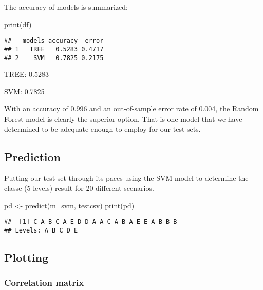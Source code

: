 \documentclass[
]{article}
\newenvironment{Shaded}{\begin{snugshade}}{\end{snugshade}}
\newcommand{\FunctionTok}[1]{\textcolor[rgb]{0.00,0.00,0.00}{#1}}
\newcommand{\NormalTok}[1]{#1}
\newcommand{\OtherTok}[1]{\textcolor[rgb]{0.56,0.35,0.01}{#1}}
\begin{document}
The accuracy of models is summarized:

\begin{Shaded}
\begin{Highlighting}[]
\FunctionTok{print}\NormalTok{(df)}
\end{Highlighting}
\end{Shaded}

\begin{verbatim}
##   models accuracy  error
## 1   TREE   0.5283 0.4717
## 2    SVM   0.7825 0.2175
\end{verbatim}

TREE: 0.5283

SVM: 0.7825

With an accuracy of 0.996 and an out-of-sample error rate of 0.004, the
Random Forest model is clearly the superior option. That is one model
that we have determined to be adequate enough to employ for our test
sets.

\hypertarget{prediction}{%
\subsection{Prediction}\label{prediction}}

Putting our test set through its paces using the SVM model to determine
the classe (5 levels) result for 20 different scenarios.

\begin{Shaded}
\begin{Highlighting}[]
\NormalTok{pd }\OtherTok{\textless{}{-}} \FunctionTok{predict}\NormalTok{(m\_svm, testcsv)}
\FunctionTok{print}\NormalTok{(pd)}
\end{Highlighting}
\end{Shaded}

\begin{verbatim}
##  [1] C A B C A E D D A A C A B A E E A B B B
## Levels: A B C D E
\end{verbatim}

\hypertarget{plotting}{%
\subsection{Plotting}\label{plotting}}

\hypertarget{correlation-matrix}{%
\subsubsection{Correlation matrix}\label{correlation-matrix}}
\end{document}
